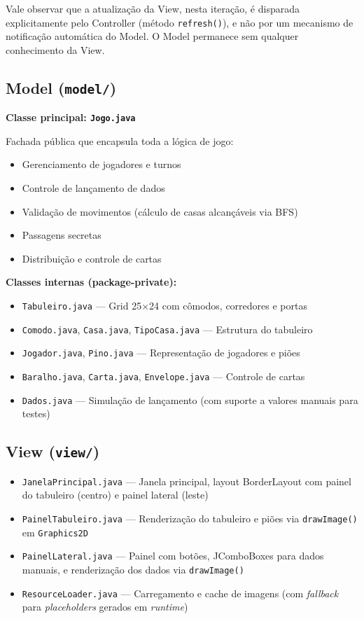 \documentclass[12pt,a4paper]{report}
\begin{document}
Vale observar que a atualização da View, nesta iteração, é disparada explicitamente pelo Controller (método \texttt{refresh()}), e não por um mecanismo de notificação automática do Model. O Model permanece sem qualquer conhecimento da View.

\subsection{Model (\texttt{model/})}

\textbf{Classe principal: \texttt{Jogo.java}}

Fachada pública que encapsula toda a lógica de jogo:

\begin{itemize}
    \item Gerenciamento de jogadores e turnos
    \item Controle de lançamento de dados
    \item Validação de movimentos (cálculo de casas alcançáveis via BFS)
    \item Passagens secretas
    \item Distribuição e controle de cartas
\end{itemize}

\textbf{Classes internas (package-private):}
\begin{itemize}
    \item \texttt{Tabuleiro.java} --- Grid 25×24 com cômodos, corredores e portas
    \item \texttt{Comodo.java}, \texttt{Casa.java}, \texttt{TipoCasa.java} --- Estrutura do tabuleiro
    \item \texttt{Jogador.java}, \texttt{Pino.java} --- Representação de jogadores e piões
    \item \texttt{Baralho.java}, \texttt{Carta.java}, \texttt{Envelope.java} --- Controle de cartas
    \item \texttt{Dados.java} --- Simulação de lançamento (com suporte a valores manuais para testes)
\end{itemize}

\subsection{View (\texttt{view/})}

\begin{itemize}
    \item \texttt{JanelaPrincipal.java} --- Janela principal, layout BorderLayout com painel do tabuleiro (centro) e painel lateral (leste)
    \item \texttt{PainelTabuleiro.java} --- Renderização do tabuleiro e piões via \texttt{drawImage()} em \texttt{Graphics2D}
    \item \texttt{PainelLateral.java} --- Painel com botões, JComboBoxes para dados manuais, e renderização dos dados via \texttt{drawImage()}
    \item \texttt{ResourceLoader.java} --- Carregamento e cache de imagens (com \textit{fallback} para \textit{placeholders} gerados em \textit{runtime})
\end{itemize}
\end{document}
